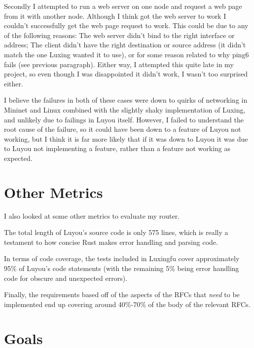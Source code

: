\documentclass[12pt,a4paper,twoside,openright]{report}
\begin{document}
\bigskip

Secondly I attempted to run a web server on one node and request a web page from it with another node.  Although I think got the web server to work I couldn't successfully get the web page request to work.  This could be due to any of the following reasons: The web server didn't bind to the right interface or address;  The client didn't have the right destination or source address (it didn't match the one Luxing wanted it to use), or for some reason related to why ping6 fails (see previous paragraph).  Either way, I attempted this quite late in my project, so even though I was disappointed it didn't   work, I wasn't too surprised either.

\bigskip

I believe the failures in both of these cases were down to quirks of networking in Mininet and Linux combined with the slightly shaky implementation of Luxing, and unlikely due to failings in Luyou itself. However, I failed to understand the root cause of the failure, so it could have been down to a feature of Luyou not working, but I think it is far more likely that if it was down to Luyou it was due to Luyou not implementing a feature, rather than a feature not working as expected.

\section{Other Metrics}

I also looked at some other metrics to evaluate my router. 

\bigskip

The total length of Luyou's source code is only 575 lines, which is really a testament to how concise Rust makes error handling and parsing code.

\bigskip

In terms of code coverage, the tests included in Luxingfu cover approximately 95\% of Luyou's code statements (with the remaining 5\% being error handling code for obscure and unexpected errors).

\bigskip

Finally, the requirements based off of the aspects of the RFCs that \textit{need} to be implemented end up covering around 40\%-70\% of the body of the relevant RFCs.

\section{Goals}
\end{document}
